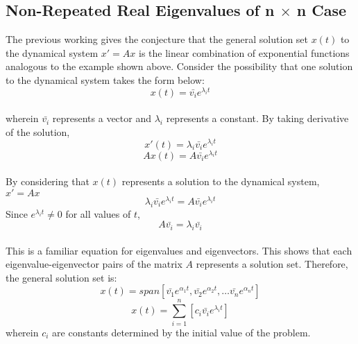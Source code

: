 \documentclass[a4paper, 12pt]{report}
\def\a{\alpha}
\def\la{\lambda}
\def\l{\left}
\def\r{\right}
\def\dst{\displaystyle}
\def\b{\bar}
\begin{document}
\begin{center}
\subsection{Non-Repeated Real Eigenvalues of n $\times$ n Case}
The previous working gives the conjecture that the general solution set $x(t)$ to the dynamical system $x' = Ax$ is the linear combination of exponential functions analogous to the example shown above. Consider the possibility that one solution to the dynamical system takes the form below:
$$x(t) = \b{v_i}e^{\la_i t}$$
\\wherein $\b{v_i}$ represents a vector and $\la_i$ represents a constant. By taking derivative of the solution, 
$$x'(t) = \la_i\b{v_i}e^{\la_i t}$$
$$Ax(t) = A\b{v_i}e^{\la_i t}$$
\\By considering that $x(t)$ represents a solution to the dynamical system, $\dst{x' = Ax}$
$$\la_i\b{v_i}e^{\la_i t} = A\b{v_i}e^{\la_i t}$$
Since $e^{\la_i t} \neq 0$ for all values of $t$,
$$A\b{v_i} = \la_i\b{v_i}$$
\\This is a familiar equation for eigenvalues and eigenvectors. This shows that each eigenvalue-eigenvector pairs of the matrix $A$ represents a solution set. Therefore, the general solution set is:
$$x(t) = span[\b{v_1}e^{\a_1 t}, \b{v_2}e^{\a_2 t}, \dots \b{v_n}e^{\a_n t}]$$
$$x(t) = \sum_{i = 1}^{n} \l[c_i\b{v_i}e^{\la_i t}\r]$$
wherein $c_i$ are constants determined by the initial value of the problem. 

\end{center}
\end{document}
